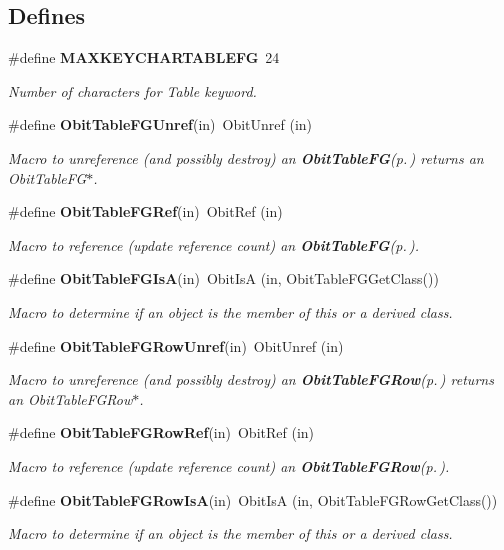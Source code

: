 \subsection*{Defines}
\begin{CompactItemize}
\item 
\#define {\bf MAXKEYCHARTABLEFG}\ 24
\begin{CompactList}\small\item\em Number of characters for Table keyword. \item\end{CompactList}\item 
\#define {\bf Obit\-Table\-FGUnref}(in)\ Obit\-Unref (in)
\begin{CompactList}\small\item\em Macro to unreference (and possibly destroy) an {\bf Obit\-Table\-FG}{\rm (p.\,\pageref{structObitTableFG})} returns an Obit\-Table\-FG$\ast$. \item\end{CompactList}\item 
\#define {\bf Obit\-Table\-FGRef}(in)\ Obit\-Ref (in)
\begin{CompactList}\small\item\em Macro to reference (update reference count) an {\bf Obit\-Table\-FG}{\rm (p.\,\pageref{structObitTableFG})}. \item\end{CompactList}\item 
\#define {\bf Obit\-Table\-FGIs\-A}(in)\ Obit\-Is\-A (in, Obit\-Table\-FGGet\-Class())
\begin{CompactList}\small\item\em Macro to determine if an object is the member of this or a derived class. \item\end{CompactList}\item 
\#define {\bf Obit\-Table\-FGRow\-Unref}(in)\ Obit\-Unref (in)
\begin{CompactList}\small\item\em Macro to unreference (and possibly destroy) an {\bf Obit\-Table\-FGRow}{\rm (p.\,\pageref{structObitTableFGRow})} returns an Obit\-Table\-FGRow$\ast$. \item\end{CompactList}\item 
\#define {\bf Obit\-Table\-FGRow\-Ref}(in)\ Obit\-Ref (in)
\begin{CompactList}\small\item\em Macro to reference (update reference count) an {\bf Obit\-Table\-FGRow}{\rm (p.\,\pageref{structObitTableFGRow})}. \item\end{CompactList}\item 
\#define {\bf Obit\-Table\-FGRow\-Is\-A}(in)\ Obit\-Is\-A (in, Obit\-Table\-FGRow\-Get\-Class())
\begin{CompactList}\small\item\em Macro to determine if an object is the member of this or a derived class. \item\end{CompactList}\end{CompactItemize}
